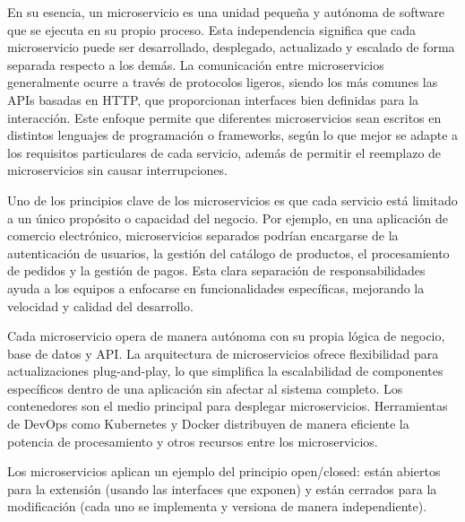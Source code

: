 \documentclass[12pt]{book}
\begin{document}
En su esencia, un microservicio es una unidad pequeña y autónoma de software que se ejecuta en su propio proceso. Esta independencia significa que cada microservicio puede ser desarrollado, desplegado, actualizado y escalado de forma separada respecto a los demás. La comunicación entre microservicios generalmente ocurre a través de protocolos ligeros, siendo los más comunes las APIs basadas en HTTP, que proporcionan interfaces bien definidas para la interacción. Este enfoque permite que diferentes microservicios sean escritos en distintos lenguajes de programación o frameworks, según lo que mejor se adapte a los requisitos particulares de cada servicio, además de permitir el reemplazo de microservicios sin causar interrupciones.

Uno de los principios clave de los microservicios es que cada servicio está limitado a un único propósito o capacidad del negocio. Por ejemplo, en una aplicación de comercio electrónico, microservicios separados podrían encargarse de la autenticación de usuarios, la gestión del catálogo de productos, el procesamiento de pedidos y la gestión de pagos. Esta clara separación de responsabilidades ayuda a los equipos a enfocarse en funcionalidades específicas, mejorando la velocidad y calidad del desarrollo.

Cada microservicio opera de manera autónoma con su propia lógica de negocio, base de datos y API. La arquitectura de microservicios ofrece flexibilidad para actualizaciones plug-and-play, lo que simplifica la escalabilidad de componentes específicos dentro de una aplicación sin afectar al sistema completo. Los contenedores son el medio principal para desplegar microservicios. Herramientas de DevOps como Kubernetes y Docker distribuyen de manera eficiente la potencia de procesamiento y otros recursos entre los microservicios.

Los microservicios aplican un ejemplo del principio open/closed: están abiertos para la extensión (usando las interfaces que exponen) y están cerrados para la modificación (cada uno se implementa y versiona de manera independiente).
\end{document}
